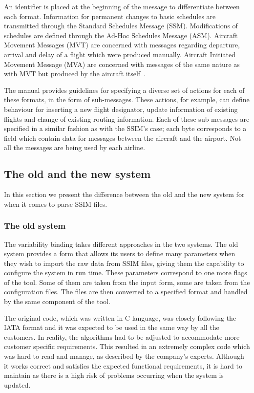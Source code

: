 An identifier is placed at the beginning of the message to differentiate between each format. Information for permanent changes to basic schedules are transmitted through the Standard Schedules Message (SSM). Modifications of schedules are defined through the Ad-Hoc Schedules Message (ASM). Aircraft Movement Messages (MVT) are concerned with messages regarding departure, arrival and delay of a flight which were produced manually. Aircraft Initiated Movement Message (MVA) are concerned with messages of the same nature as with MVT but produced by the aircraft itself~\cite{IATA}. %


The manual provides guidelines for specifying a diverse set of actions for each of these formats, in the form of sub-messages. These actions, for example, can define behaviour for inserting a new flight designator, update information of existing flights and change of existing routing information. Each of these sub-messages are specified in a similar fashion as with the SSIM's case; each byte corresponds to a field which contain data for messages between the aircraft and the airport. Not all the messages are being used by each airline. 

\subsection{The old and the new system}
In this section we present the difference between the old and the new system for when it comes to parse SSIM files. 

\subsubsection{The old system}
The variability binding takes different approaches in the two systems. The old system provides a form that allows its users to define many parameters when they wish to import the raw data from SSIM files, giving them the capability to configure the system in run time. These parameters correspond to one more flags of the tool. Some of them are taken from the input form, some are taken from the configuration files. The files are then converted to a specified format and handled by the same component of the tool.

The original code, which was written in C language, was closely following the IATA format and it was expected to be used in the same way by all the customers. In reality, the algorithms had to be adjusted to accommodate more customer specific requirements. 
This resulted in an extremely complex code which was 
hard to read and manage, as described by the company's experts. Although it works correct and satisfies the expected functional requirements, it is hard to maintain as there is a high risk of problems occurring when the system is updated.

